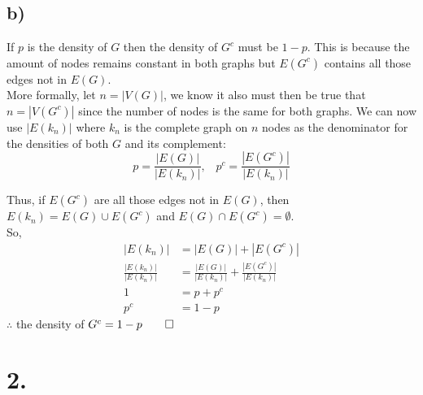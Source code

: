 \documentclass{article}
\begin{document}
        \subsection*{b)}
            \begin{minipage}{1\textwidth}
                If $p$ is the density of $G$ then the density of $G^{c}$ must be
                $1-p$. This is because the amount of nodes remains constant in both graphs
                but $E(G^{c})$ contains all those edges not in $E(G)$.\\

                More formally, let $n=|V(G)|$, we know it also must then be true that $n=|V(G^{c})|$ since the
                number of nodes is the same for both graphs. We can now use $|E(k_{n})|$ where $k_{n}$ is the complete
                graph on $n$ nodes as the denominator for the densities of both $G$ and its complement:
                $$ p= \frac{|E(G)|}{|E(k_{n})|}, \hspace{10pt}p^{c}=\frac{|E(G^{c})|}{|E(k_{n})|}$$
                
                Thus, if $E(G^{c})$ are all those edges not in $E(G)$, then $E(k_{n}) = E(G) \cup E(G^{c})$ and
                $E(G) \cap E(G^{c}) = \emptyset$.\\
                So,
                \begin{align*}
                                         |E(k_{n})| &= |E(G)| + |E(G^{c})|\\
                    \frac{|E(k_{n})|}{|E(k_{n})|} &= \frac{|E(G)|}{|E(k_{n})|} + \frac{|E(G^{c})|}{|E(k_{n})|}\\
                                                1 &= p + p^{c}\\
                                            p^{c} &= 1 - p
                \end{align*}
                $ \therefore $ the density of $G^{c} = 1 - p \qed$
            \end{minipage}
        
    \section*{2.}
\end{document}
